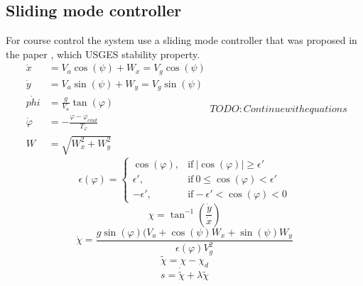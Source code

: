 \subsection{Sliding mode controller}
For course control the system use a sliding mode controller that was proposed in the paper \citep{fortuna2015cascaded}, which USGES stability property.
\begin{subequations}
\begin{align}
\dot{x} &= V_a\cos(\psi) + W_x = V_g\cos(\psi) \\
\dot{y} &= V_a\sin(\psi) + W_y = V_g\sin(\psi) \\
\dot{phi} &= \frac{g}{V_a}\tan(\varphi) \\
\dot{\varphi} &= -\frac{\varphi-\varphi_{cmd}}{T_\varphi} \\
W &= \sqrt{W_x^2 + W_y^2}
\end{align}
TODO: Continue with equations
\end{subequations}
\begin{equation}
\epsilon(\varphi) = \begin{cases}
\cos(\varphi), & \text{if}\ |\cos(\varphi)|\geq\epsilon'\\
\epsilon', & \text{if}\ 0 \leq \cos(\varphi) < \epsilon' \\
-\epsilon', & \text{if} -\epsilon'<\cos(\varphi) < 0
\end{cases}
\end{equation}
\begin{equation}
\chi = \tan^{-1}(\frac{\dot{y}}{\dot{x}})
\end{equation}
\begin{equation}
\dot{\chi} = \frac{g\sin(\varphi)(V_a + \cos(\psi)W_x + \sin(\psi)W_y}{\epsilon(\varphi)V_g^2}
\end{equation}
\begin{equation}
\tilde{\chi} = \chi - \chi_d
\end{equation}
\begin{equation}
s = \dot{\tilde{\chi}} + \lambda\tilde{\chi}
\end{equation}